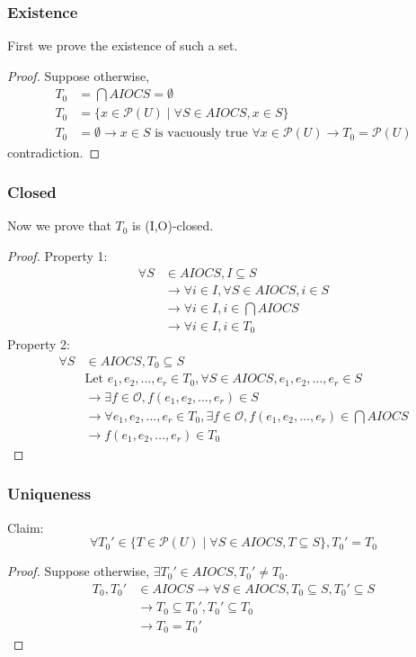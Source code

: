 \documentclass{article}
\begin{document}
\subsubsection*{Existence}
First we prove the existence of such a set. 
\begin{proof}
    Suppose otherwise, 
    \begin{align*}
T_0 &= \bigcap AIOCS = \emptyset \\
T_0 &= \{x \in \mathcal{P}(U) \mid \forall S \in AIOCS, x \in S\}\\
T_0 &= \emptyset \rightarrow x \in S \text{ is vacuously true } \forall x \in \mathcal{P}(U) \rightarrow T_0 = \mathcal{P}(U)
    \end{align*}
    contradiction.
\end{proof}
\subsubsection*{Closed}
Now we prove that $T_0$ is (I,O)-closed.
\begin{proof}
    Property 1:
    \begin{align*}
        \forall S &\in AIOCS, I \subseteq S \\
        &\rightarrow \forall i \in I, \forall S \in AIOCS, i \in S\\
        &\rightarrow \forall i \in I, i \in \bigcap AIOCS\\
        &\rightarrow \forall i \in I, i \in T_0
    \end{align*}
    Property 2:
    \begin{align*}
        \forall S &\in AIOCS, T_0 \subseteq S\\
        &\text{Let } e_1, e_2, \dots, e_r \in T_0, \forall S \in AIOCS, e_1, e_2, \dots, e_r \in S \\
        &\rightarrow \exists f \in \mathcal{O}, f(e_1, e_2, \dots, e_r) \in S\\
        &\rightarrow \forall e_1, e_2, \dots, e_r \in T_0, \exists f \in \mathcal{O}, f(e_1, e_2, \dots, e_r) \in \bigcap AIOCS\\
        &\rightarrow f(e_1, e_2, \dots, e_r) \in T_0
    \end{align*}
\end{proof}
\subsubsection*{Uniqueness}
Claim: 
\[\forall T_0' \in \{T \in \mathcal{P}(U)\mid \forall S \in AIOCS, T \subseteq S\}, T_0' = T_0\]
\begin{proof}
    Suppose otherwise, $\exists T_0' \in AIOCS, T_0' \neq T_0$. 
    \begin{align*}
        T_0, T_0' &\in AIOCS \rightarrow \forall S \in AIOCS, T_0 \subseteq S, T_0' \subseteq S\\
        &\rightarrow T_0 \subseteq T_0', T_0' \subseteq T_0\\
        &\rightarrow T_0 = T_0'
    \end{align*}
\end{proof}
\end{document}
